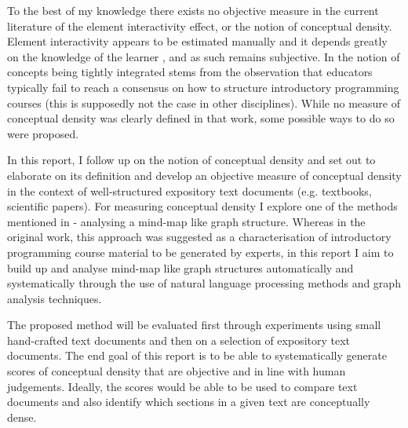 \documentclass[12pt]{article}
\begin{document}
To the best of my knowledge there exists no objective measure in the current literature of the element interactivity effect, or the notion of conceptual density. Element interactivity appears to be estimated manually and it depends greatly on the knowledge of the learner \citep{chandler1996cognitive}, and as such remains subjective. In \citep{robins2010learning} the notion of concepts being tightly integrated stems from the observation that educators typically fail to reach a consensus on how to structure introductory programming courses (this is supposedly not the case in other disciplines).  While no measure of conceptual density was clearly defined in that work, some possible ways to do so were proposed.

In this report,  I follow up on the notion of conceptual density and set out to elaborate on its definition and develop an objective measure of conceptual density in the context of well-structured expository text documents (e.g. textbooks, scientific papers). For measuring conceptual density I explore one of the methods mentioned in \citep{robins2010learning} - analysing a mind-map like graph structure. Whereas in the original work, this approach was suggested as a characterisation of  introductory programming course material to be generated by experts, in this report I aim to build up and analyse mind-map like graph structures automatically and systematically through the use of natural language processing methods and graph analysis techniques.

The proposed method will be evaluated first through experiments using small hand-crafted text documents and then on a selection of expository text documents. The end goal of this report is to be able to systematically generate scores of conceptual density that are objective and in line with human judgements. Ideally, the scores would be able to be used to compare text documents and also identify which sections in a given text are conceptually dense.

\end{document}
